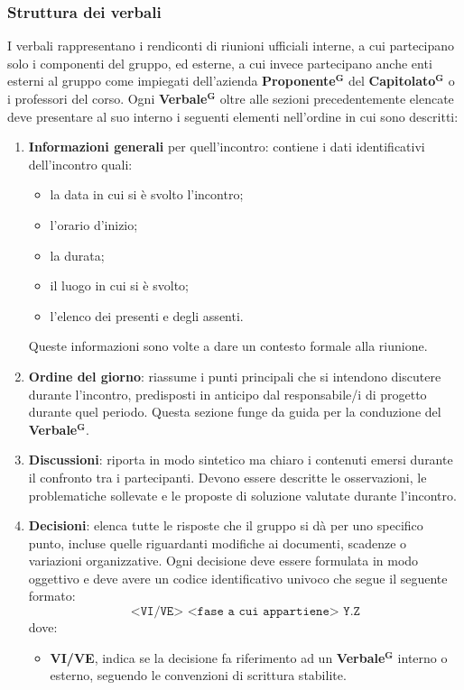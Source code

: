 \documentclass[a4paper,12pt]{article}
\newcommand{\term}[1]{\textbf{#1}$^\mathbf{G}$}
\begin{document}
\subsubsection*{Struttura dei verbali}
I verbali rappresentano i rendiconti di riunioni ufficiali interne, a cui partecipano solo i componenti del gruppo, ed esterne, a cui invece partecipano anche enti esterni al gruppo come impiegati dell'azienda \term{Proponente} del \term{Capitolato} o i professori del corso. Ogni \term{Verbale} oltre alle sezioni precedentemente elencate deve presentare al suo interno i seguenti elementi nell'ordine in cui sono descritti:
\begin{enumerate}
  \item \textbf{Informazioni generali} per quell'incontro: contiene i dati identificativi dell’incontro quali: 
  \begin{itemize}
      \item la data in cui si è svolto l'incontro;
      \item l'orario d'inizio;
      \item la durata;
      \item il luogo in cui si è svolto;
      \item l'elenco dei presenti e degli assenti.
  \end{itemize}
    Queste informazioni sono volte a dare un contesto formale alla riunione.
  \item \textbf{Ordine del giorno}: riassume i punti principali che si intendono discutere durante l’incontro, predisposti in anticipo dal responsabile/i di progetto durante quel periodo. Questa sezione funge da guida per la conduzione del \term{Verbale}.
  \item \textbf{Discussioni}: riporta in modo sintetico ma chiaro i contenuti emersi durante il confronto tra i partecipanti. Devono essere descritte le osservazioni, le problematiche sollevate e le proposte di soluzione valutate durante l’incontro.
  \item \textbf{Decisioni}: elenca tutte le risposte che il gruppo si dà per uno specifico punto, incluse quelle riguardanti modifiche ai documenti, scadenze o variazioni organizzative. Ogni decisione deve essere formulata in modo oggettivo e deve avere un codice identificativo univoco che segue il seguente formato:
  \[
\texttt{<VI/VE> <fase a cui appartiene> Y.Z}
\]
dove:
\begin{itemize}
    \item \textbf{VI/VE}, indica se la decisione fa riferimento ad un \term{Verbale} interno o esterno, seguendo le convenzioni di scrittura stabilite.

\end{itemize}
\end{enumerate}
\end{document}

